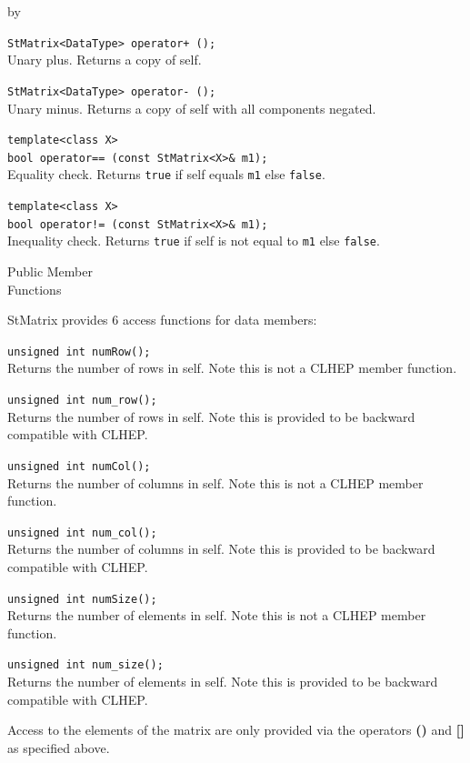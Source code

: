 \documentclass[twoside]{article}
\newcommand{\comp}[1]{\texttt{#1}}%
\newcommand{\entrylabel}[1]{\mbox{\textbf{{#1}}}\hfil}%
\newenvironment{entry}
{\begin{list}{}%
    {\renewcommand{\makelabel}{\entrylabel}%
     \setlength{\labelwidth}{90pt}%
     \setlength{\leftmargin}{\labelwidth}
     \advance\leftmargin by \labelsep%
      }%
    }%
  {\end{list}}
\newcommand{\Entrylabel}[1]%
{\raisebox{0pt}[1ex][0pt]{\makebox[\labelwidth][l]%
    {\parbox[t]{\labelwidth}{\hspace{0pt}\textbf{{#1}}}}}}
\newenvironment{Entry}%
{\renewcommand{\entrylabel}{\Entrylabel}\begin{entry}}%
  {\end{entry}}
\begin{document}
\begin{Entry}
    \verb#StMatrix<DataType> operator+ ();#\\
    Unary plus. Returns a copy of self.

    \verb+StMatrix<DataType> operator- ();+\\
    Unary minus. Returns a copy of self with all components negated.
        
    \verb+template<class X>+\\
    \verb+bool operator== (const StMatrix<X>& m1);+\\
    Equality check. Returns \comp{true} if self equals
    \comp{m1} else \comp{false}.
    
    \verb+template<class X>+\\
    \verb+bool operator!= (const StMatrix<X>& m1);+\\
    Inequality check. Returns \comp{true} if self is not equal to
    \comp{m1} else \comp{false}.
    
\item[Public Member\\ Functions]

  StMatrix provides 6 access functions for data members:
  
  \verb+unsigned int numRow();+\\
  Returns the number of rows in self.  Note this is
  not a CLHEP member function.

  \verb+unsigned int num_row();+\\
  Returns the number of rows in self.  Note this is
  provided to be backward compatible with CLHEP.

  \verb+unsigned int numCol();+\\
  Returns the number of columns in self.  Note this is
  not a CLHEP member function.

  \verb+unsigned int num_col();+\\
  Returns the number of columns in self.  Note this is
  provided to be backward compatible with CLHEP.

  \verb+unsigned int numSize();+\\
  Returns the number of elements in self.  Note this is
  not a CLHEP member function.
  
  \verb+unsigned int num_size();+\\
  Returns the number of elements in self.  Note this is
  provided to be backward compatible with CLHEP.

  Access to the elements of the matrix are only provided
  via the operators {\bf ()} and {\bf []} as specified above.  


\end{Entry}
\end{document}
